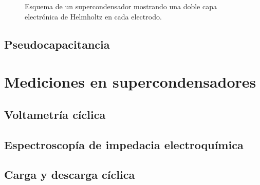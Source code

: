 \begin{figure}[h!]
	\centering
	\caption{Esquema de un supercondensador mostrando una doble capa electrónica de Helmholtz en cada electrodo.}
	\label{fig:edlc}
\end{figure}
\subsection{Pseudocapacitancia}


\section{Mediciones en supercondensadores}
\subsection{Voltametría cíclica}
\subsection{Espectroscopía de impedacia electroquímica}
\subsection{Carga y descarga cíclica}
